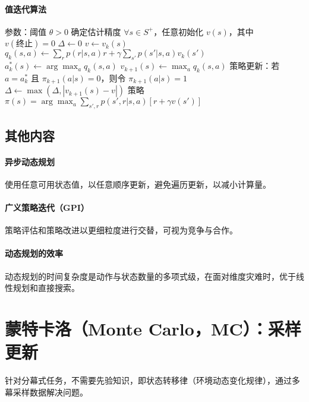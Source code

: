 \documentclass[
12pt, %
a4paper, 
oneside, %
headinclude,footinclude, %
]{scrartcl}
\begin{document}
\paragraph{值迭代算法}
\begin{myalgorithm}[值迭代算法]
\State 参数：阈值 $\theta > 0$ 确定估计精度
\State $\forall s \in S^+$，任意初始化 $v(s)$，其中 $v(\text{终止}) = 0$
\Repeat
    \State $\Delta \gets 0$
        \State $v \gets v_k(s)$
            \State $q_k(s, a) \gets \sum_r p(r|s, a)r + \gamma \sum_{s'} p(s'|s, a)v_k(s')$
        \EndFor
        \State $a^*_k(s) \gets \arg\max_a q_k(s, a)$
        \State $v_{k+1}(s) \gets \max_a q_k(s, a)$
        \State 策略更新：若 $a = a^*_k$ 且 $\pi_{k+1}(a|s) = 0$，则令 $\pi_{k+1}(a|s) = 1$
        \State $\Delta \gets \max(\Delta, |v_{k+1}(s) - v|)$
    \EndFor
\Until{$\Delta < \theta$}
\State \Return 策略 $\pi(s) = \arg\max_a \sum_{s',r}p(s',r|s,a)[r + \gamma v(s')]$
\end{myalgorithm}
\subsection{其他内容}
\paragraph{异步动态规划}
使用任意可用状态值，以任意顺序更新，避免遍历更新，以减小计算量。
\paragraph{广义策略迭代（GPI）}
策略评估和策略改进以更细粒度进行交替，可视为竞争与合作。
\paragraph{动态规划的效率}
动态规划的时间复杂度是动作与状态数量的多项式级，在面对维度灾难时，优于线性规划和直接搜索。
\section{蒙特卡洛（Monte Carlo，MC）：采样更新}
针对分幕式任务，不需要先验知识，即状态转移律（环境动态变化规律），通过多幕采样数据解决问题。
\end{document}

